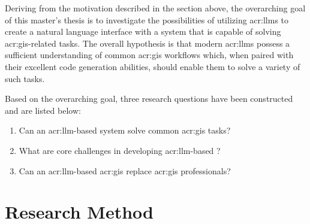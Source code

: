 \begin{comment}
Potentially, how well the goals have been met (and how well the research questions have been answered)
is a theme that you should return to towards the end of the thesis (so in Chapter~\ref{cha:conclusion} and/or Chapter~\ref{cha:discussion}).

For a Specialisation Project, the goal would primarily be to get up to speed with the research field, so the research questions will rather be
limited to exploring what the state-of-the-art is, what methods and data have been used, etc.
A secondary goal of the specialisation is to frame the research questions and goals of the Master's Thesis.
Note that a major difference between the Specialisation Project and the Master's Thesis is that the Master's Thesis work \textit{has\/} to
introduce new research.
Of course the Specialisation Project can also introduce novel work, but there is no such requirement --- and most commonly it does not,
since the core of the project really is to figure out what is ``old'' before you can introduce something which is new.
\end{comment}

Deriving from the motivation described in the section above, the overarching goal of this master's thesis is to investigate the possibilities of utilizing \glspl{acr:llm} to create a natural language interface with a system that is capable of solving \acrshort{acr:gis}-related tasks. The overall hypothesis is that modern \glspl{acr:llm} possess a sufficient understanding of common \acrshort{acr:gis} workflows which, when paired with their excellent code generation abilities, should enable them to solve a variety of such tasks.

Based on the overarching goal, three research questions have been constructed and are listed below:

\begin{enumerate}
    \item Can an \gls{acr:llm}-based system solve common \acrshort{acr:gis} tasks? \label{rq:gis-question-answering}
    \item What are core challenges in developing \acrshort{acr:llm}-based ? \label{rq:development-challenges}
    \item Can an \acrshort{acr:llm}-based \acrshort{acr:gis} replace \acrshort{acr:gis} professionals? \label{rq:replaing-gis-professionals}
\end{enumerate}

\section{Research Method}
\label{sec:research-method}

